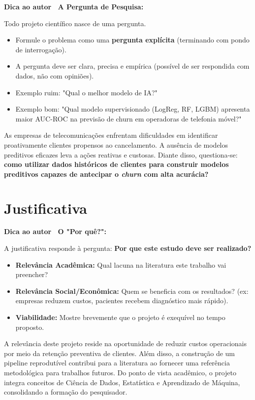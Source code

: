 \documentclass[
    article,
    12pt,
    oneside,
    a4paper,
    english,
    brazilian
    ]{abntex2}
\numberwithin{equation}{section}
\newenvironment{dica}{%
    \par\medskip
    \color{blue!60!black}\small\itshape
}{%
    \par\medskip
}
\begin{document}
\begin{dica}
\noindent\textbf{Dica ao autor \textemdash\ A Pergunta de Pesquisa:}

Todo projeto científico nasce de uma pergunta.
\begin{itemize}
    \item Formule o problema como uma \textbf{pergunta explícita} (terminando com pondo de interrogação).
    \item A pergunta deve ser clara, precisa e empírica (possível de ser respondida com dados, não com opiniões).
    \item Exemplo ruim: "Qual o melhor modelo de IA?"
    \item Exemplo bom: "Qual modelo supervisionado (LogReg, RF, LGBM) apresenta maior AUC-ROC na previsão de churn em operadoras de telefonia móvel?"
\end{itemize}
\end{dica}

As empresas de telecomunicações enfrentam dificuldades em identificar proativamente clientes propensos ao cancelamento. A ausência de modelos preditivos eficazes leva a ações reativas e custosas. Diante disso, questiona-se: \textbf{como utilizar dados históricos de clientes para construir modelos preditivos capazes de antecipar o \textit{churn} com alta acurácia?}

\section{Justificativa}

\begin{dica}
\noindent\textbf{Dica ao autor \textemdash\ O "Por quê?":}

A justificativa responde à pergunta: \textbf{Por que este estudo deve ser realizado?}
\begin{itemize}
    \item \textbf{Relevância Acadêmica:} Qual lacuna na literatura este trabalho vai preencher?
    \item \textbf{Relevância Social/Econômica:} Quem se beneficia com os resultados? (ex: empresas reduzem custos, pacientes recebem diagnóstico mais rápido).
    \item \textbf{Viabilidade:} Mostre brevemente que o projeto é exequível no tempo proposto.
\end{itemize}
\end{dica}

A relevância deste projeto reside na oportunidade de reduzir custos operacionais por meio da retenção preventiva de clientes. Além disso, a construção de um pipeline reprodutível contribui para a literatura ao fornecer uma referência metodológica para trabalhos futuros. Do ponto de vista acadêmico, o projeto integra conceitos de Ciência de Dados, Estatística e Aprendizado de Máquina, consolidando a formação do pesquisador.
\end{document}

